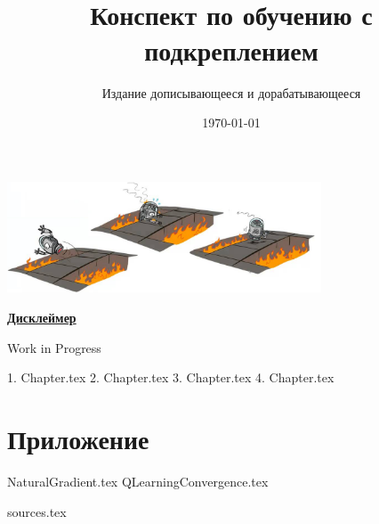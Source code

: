 \documentclass[a4paper, 10pt, oneside]{memoir}
\title{
\vspace{4cm}
\normalfont \normalsize 
\horrule{0.5pt} \\[0.4cm]
\huge Конспект по обучению с подкреплением
\horrule{2pt} \\[0.5cm]
}
\author{Издание дописывающееся и дорабатывающееся}
\date{\normalsize\today}
\begin{document}

\maketitle
\thispagestyle{empty}

\begin{center}
    \includegraphics[width=0.7\textwidth]{Images/robot.png}
\end{center}

\vspace{2cm}
\begin{center}
\textcolor{ChadBlue}{\underline{\textbf{Дисклеймер}}}

\vspace{1cm}
Work in Progress
\end{center}


\newpage
\tableofcontents*

{1. Chapter.tex}
{2. Chapter.tex}
{3. Chapter.tex}
{4. Chapter.tex}




\chapter{Приложение}

{NaturalGradient.tex}
{QLearningConvergence.tex}

{sources.tex}

\end{document}
